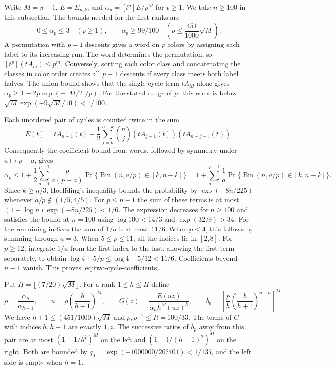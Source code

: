 Write $M=n-1$, $E=E_{n,k}$, and
$\alpha_p=[t^p]E/p^M$ for $p\ge1$. We take $n\ge100$ in this
subsection. The bounds needed for the first ranks are
\begin{equation}
 0\le\alpha_p\le3\quad(p\ge1),\qquad
 \alpha_p\ge99/100\quad
 \left(p\le \frac{451}{1000}\sqrt M\right).
 \label{eq:two-cycle-coefficients}
\end{equation}
A permutation with $p-1$ descents gives a word on $p$ colors by assigning
each label to its increasing run. The word determines the permutation,
so $[t^p](tA_m)\le p^m$. Conversely, sorting each color class and
concatenating the classes in color order creates all $p-1$ descents
if every class meets both label halves. The union bound shows that
the single-cycle term $tA_M$ alone gives
$\alpha_p\ge 1-2p\exp(-\lfloor M/2\rfloor/p)$. For the stated
range of $p$, this error is below
$\sqrt M\exp(-9\sqrt M/10)<1/100$.

Each unordered pair of cycles is counted twice in the sum
\begin{equation}
 E(t)=tA_{n-1}(t)+\frac12\sum_{j=k}^{n-k}\binom nj
                (tA_{j-1}(t))(tA_{n-j-1}(t)).
 \label{eq:two-cycle-exact-polynomial}
\end{equation}
Consequently the coefficient bound from words, followed by symmetry
under $a\mapsto p-a$, gives
\[
 \alpha_p\le
 1+\frac12\sum_{a=1}^{p-1}\frac{p}{a(p-a)}
        \Pr\{\operatorname{Bin}(n,a/p)\in[k,n-k]\}
 =
 1+\sum_{a=1}^{p-1}\frac1a
        \Pr\{\operatorname{Bin}(n,a/p)\in[k,n-k]\}.
\]
Since $k\ge n/3$, Hoeffding's inequality bounds the probability by
$\exp(-8n/225)$ whenever $a/p\notin(1/5,4/5)$. For $p\le n-1$ the sum of
these terms is at most $(1+\log n)\exp(-8n/225)<1/6$.
The expression decreases for $n\ge100$ and satisfies the bound at
$n=100$ using $\log100<14/3$ and $\exp(32/9)>34$.
For the remaining indices the sum of $1/a$ is at most $11/6$.
When $p\le4$, this follows by summing through $a=3$.
When $5\le p\le11$, all the indices lie in $[2,8]$.
For $p\ge12$, integrate $1/a$ from the first index to the last,
allowing the first term separately, to obtain
$\log4+5/p\le\log4+5/12<11/6$. Coefficients beyond $n-1$ vanish.
This proves \eqref{eq:two-cycle-coefficients}.

Put $H=\lfloor(7/20)\sqrt M\rfloor$.
For a rank $1\le h\le H$ define
\[
 \rho=\frac{\alpha_h}{\alpha_{h+1}},\qquad
 u=\rho\left(\frac h{h+1}\right)^M,\qquad
 G(z)=\frac{E(uz)}{\alpha_h h^M(uz)^h},\qquad
 b_p=\left[\frac ph\left(\frac h{h+1}\right)^{p-h}\right]^M.
\]
We have $h+1\le(451/1000)\sqrt M$ and
$\rho,\rho^{-1}\le R=100/33$. The terms of $G$ with indices
$h,h+1$ are exactly $1,z$. The successive ratios of $b_p$ away from
this pair are at most $(1-1/h^2)^M$ on the left and
$(1-1/(h+1)^2)^M$ on the right. Both are bounded by
$q_0=\exp(-1000000/203401)<1/135$, and the left side is empty
when $h=1$.

